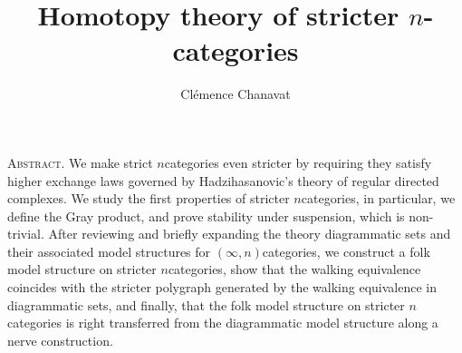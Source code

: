 \documentclass[11pt,twoside]{article}
\title{Homotopy theory of stricter $n$-categories}
\author{Cl\'emence Chanavat}
\begin{document}
\maketitle
\begin{center}
	\begin{minipage}[t]{.95\textwidth}
		\small\textsc{Abstract.}
		We make strict \( n \)\nbd categories even stricter by requiring they satisfy higher exchange laws governed by Hadzihasanovic's theory of regular directed complexes. 
		We study the first properties of stricter \( n \)\nbd categories, in particular, we define the Gray product, and prove stability under suspension, which is non-trivial. 
		After reviewing and briefly expanding the theory diagrammatic sets and their associated model structures for \( (\infty, n) \)\nbd categories, we construct a folk model structure on stricter \( n \)\nbd categories, show that the walking equivalence coincides with the stricter polygraph generated by the walking equivalence in diagrammatic sets, and finally, that the folk model structure on stricter \( n \)\nbd categories is right transferred from the diagrammatic model structure along a nerve construction.
	\end{minipage}
	
	\vspace{20pt}

	\begin{minipage}[t]{0.95\textwidth}
		\setcounter{tocdepth}{2}
		\tableofcontents
	\end{minipage}
\end{center}

\makeaftertitle








\small
\end{document}
